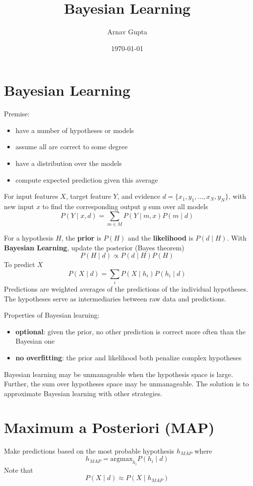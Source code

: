 \documentclass[11pt]{article}
\author{Arnav Gupta}
\date{\today}
\title{Bayesian Learning}
\begin{document}
\maketitle
\tableofcontents

\section{Bayesian Learning}
\label{sec:org2f4851a}
Premise:
\begin{itemize}
\item have a number of hypotheses or models
\item assume all are correct to some degree
\item have a distribution over the models
\item compute expected prediction given this average
\end{itemize}

For input features \(X\), target feature \(Y\), and evidence
\(d = \{ x_{1}, y_{1}, \dots, x_{N}, y_{N} \}\), with new input \(x\)
to find the corresponding output \(y\) sum over all models
$$ P(Y \mid x, d) = \sum_{m \in M} P(Y \mid m, x) P(m \mid d) $$

For a hypothesis \(H\), the \textbf{prior} is \(P(H)\) and the \textbf{likelihood} is
\(P(d \mid H)\).
With \textbf{Bayesian Learning}, update the posterior (Bayes theorem)
$$ P(H \mid d) \propto P(d \mid H) P(H) $$
To predict \(X\)
$$ P(X \mid d) = \sum_{i} P(X \mid h_{i}) P(h_{i} \mid d) $$
Predictions are weighted averages of the predictions of the individual hypotheses.
The hypotheses serve as intermediaries between raw data and predictions.

Properties of Bayesian learning:
\begin{itemize}
\item \textbf{optional}: given the prior, no other prediction is correct more often than
the Bayesian one
\item \textbf{no overfitting}: the prior and likelihood both penalize complex hypotheses
\end{itemize}

Bayesian learning may be unmanageable when the hypothesis space is large.
Further, the sum over hypotheses space may be unmanageable.
The solution is to approximate Bayesian learning with other strategies.
\section{Maximum a Posteriori (MAP)}
\label{sec:org6224436}
Make predictions based on the most probable hypothesis \(h_{MAP}\)
where
$$ h_{MAP} = \text{argmax}_{h_{i}} P(h_{i} \mid d) $$
Note that
$$ P(X \mid d) \approx P(X \mid h_{MAP}) $$
\end{document}

